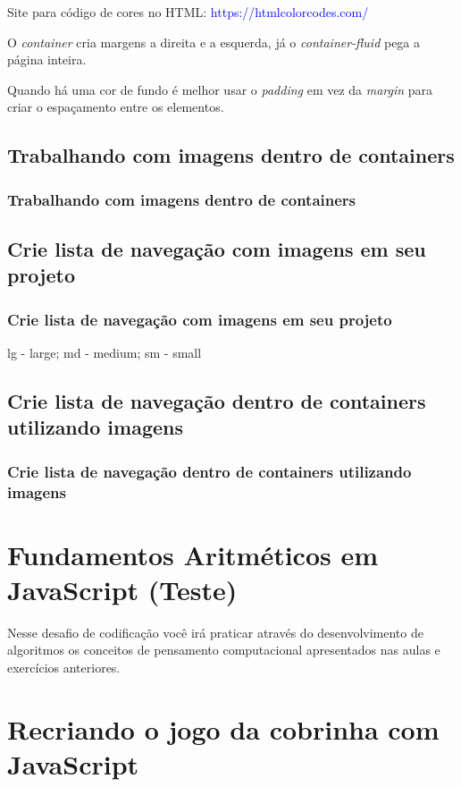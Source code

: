 \documentclass[12pt,a4paper]{article}
\begin{document}
	Site para código de cores no HTML: \textcolor{blue}{https://htmlcolorcodes.com/}
	
	O \textit{container} cria margens a direita e a esquerda, já o \textit{container-fluid} pega a página inteira. 
	
	Quando há uma cor de fundo é melhor usar o \textit{padding} em vez da \textit{margin} para criar o espaçamento entre os elementos.
	
	\subsection{Trabalhando com imagens dentro de containers}
	\subsubsection{Trabalhando com imagens dentro de containers}
	
	
	\subsection{Crie lista de navegação com imagens em seu projeto}
	\subsubsection{Crie lista de navegação com imagens em seu projeto}
	
	lg - large; md - medium; sm - small
	
	\subsection{Crie lista de navegação dentro de containers utilizando imagens}
	\subsubsection{Crie lista de navegação dentro de containers utilizando imagens}
	
	
	\section{Fundamentos Aritméticos em JavaScript (Teste)}
	
	Nesse desafio de codificação você irá praticar através do desenvolvimento de algoritmos os conceitos de pensamento computacional apresentados nas aulas e exercícios anteriores.
	
	\section{Recriando o jogo da cobrinha com JavaScript}
	
\end{document}
